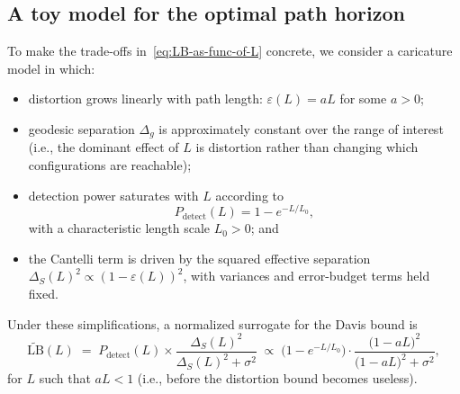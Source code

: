 \documentclass[11pt]{article}
\begin{document}
\subsection{A toy model for the optimal path horizon}
\label{subsec:path-toy}

To make the trade-offs in~\eqref{eq:LB-as-func-of-L} concrete, we consider a caricature model in
which:
\begin{itemize}[leftmargin=*]
  \item distortion grows linearly with path length: $\varepsilon(L) = a L$ for some $a>0$;
  \item geodesic separation $\Delta_g$ is approximately constant over the range of interest (i.e., the
  dominant effect of $L$ is distortion rather than changing which configurations are reachable);
  \item detection power saturates with $L$ according to
  \[
    P_{\mathrm{detect}}(L) = 1 - e^{-L / L_0},
  \]
  with a characteristic length scale $L_0>0$; and
  \item the Cantelli term is driven by the squared effective separation
  $\Delta_S(L)^2 \propto (1-\varepsilon(L))^2$, with variances and error-budget terms held fixed.
\end{itemize}

Under these simplifications, a normalized surrogate for the Davis bound is
\begin{equation}
  \label{eq:toy-LB}
  \widetilde{\mathrm{LB}}(L)
  \;=\;
  P_{\mathrm{detect}}(L)
  \times
  \frac{\Delta_S(L)^2}{\Delta_S(L)^2 + \sigma^2}
  \;\propto\;
  \bigl(1 - e^{-L / L_0}\bigr)
  \cdot
  \frac{\bigl(1 - aL\bigr)^2}{\bigl(1 - aL\bigr)^2 + \sigma^2},
\end{equation}
for $L$ such that $aL < 1$ (i.e., before the distortion bound becomes useless).
\end{document}
